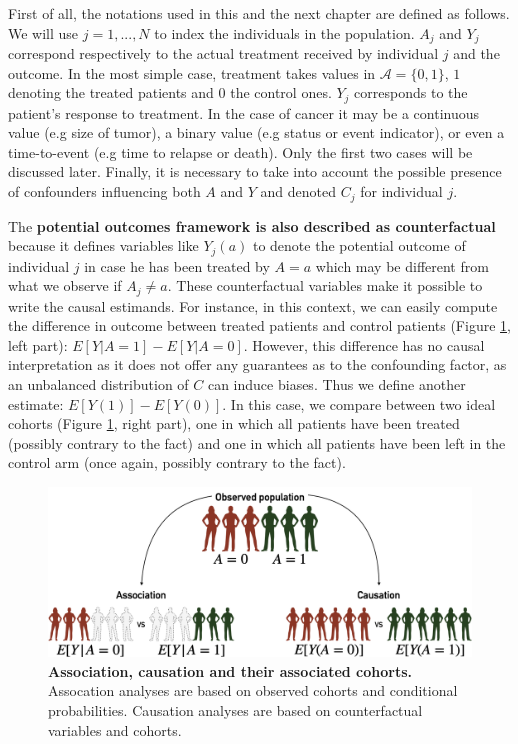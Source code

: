 \documentclass[a4paper,12pt,twoside,onecolumn,openright,final,oldfontcommands]{memoir}
\begin{document}
First of all, the notations used in this and the next chapter are
defined as follows. We will use \(j=1,...,N\) to index the individuals
in the population. \(A_j\) and \(Y_j\) correspond respectively to the
actual treatment received by individual \(j\) and the outcome. In the
most simple case, treatment takes values in \(\mathcal{A}=\{0, 1\}\),
\(1\) denoting the treated patients and \(0\) the control ones. \(Y_j\)
corresponds to the patient's response to treatment. In the case of
cancer it may be a continuous value (e.g size of tumor), a binary value
(e.g status or event indicator), or even a time-to-event (e.g time to
relapse or death). Only the first two cases will be discussed later.
Finally, it is necessary to take into account the possible presence of
confounders influencing both \(A\) and \(Y\) and denoted \(C_j\) for
individual \(j\).

The \textbf{potential outcomes framework is also described as
counterfactual} because it defines variables like \(Y_j(a)\) to denote
the potential outcome of individual \(j\) in case he has been treated by
\(A=a\) which may be different from what we observe if \(A_j\neq a\).
These counterfactual variables make it possible to write the causal
estimands. For instance, in this context, we can easily compute the
difference in outcome between treated patients and control patients
(Figure \ref{fig:causality}, left part): \(E[Y | A=1] - E[Y | A=0].\)
However, this difference has no causal interpretation as it does not
offer any guarantees as to the confounding factor, as an unbalanced
distribution of \(C\) can induce biases. Thus we define another
estimate: \(E[Y(1)] - E[Y(0)].\) In this case, we compare between two
ideal cohorts (Figure \ref{fig:causality}, right part), one in which all
patients have been treated (possibly contrary to the fact) and one in
which all patients have been left in the control arm (once again,
possibly contrary to the fact).

\begin{figure}

{\centering \includegraphics[width=0.9\linewidth]{fig/causality} 

}

\caption[Association, causation and their associated cohorts]{\textbf{Association, causation and their
associated cohorts.} Assocation analyses are based on observed cohorts
and conditional probabilities. Causation analyses are based on
counterfactual variables and cohorts.}\label{fig:causality}
\end{figure}
\end{document}
